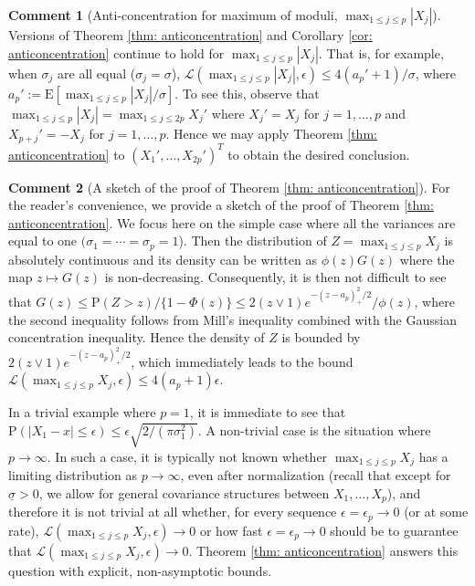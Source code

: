 \documentclass[11pt,reqno]{amsart}
\theoremstyle{definition}
\newtheorem{remark}{Comment}
\newcommand{\LL}{ \mathcal{L}}
\newcommand{\Ep}{{\mathrm{E}}}
\renewcommand{\Pr}{{\mathrm{P}}}
\begin{document}
\begin{remark}[Anti-concentration for maximum  of moduli, $\max_{1 \leq j \leq p} | X_{j} |$]
Versions of Theorem \ref{thm: anticoncentration} and Corollary \ref{cor: anticoncentration} continue to hold for $\max_{1 \leq j \leq p} | X_{j} |$.
That is, for example, when $\sigma_{j}$ are all equal ($\sigma_{j} = \sigma$), $\LL(\max_{1 \leq j \leq p} | X_{j} |, \epsilon ) \leq 4 ( a_{p}'+1)/\sigma$, where $a_{p}' := \Ep [ \max_{1 \leq j \leq p} | X_{j} |/\sigma ]$.  To see this, observe that $\max_{1 \leq j \leq p} | X_{j} | = \max_{1 \leq j \leq 2p} X_{j}'$ where $X_{j}'=X_{j}$ for $j=1,\dots,p$ and $X_{p+j}' = - X_{j}$ for $j=1,\dots,p$. Hence we may apply Theorem \ref{thm: anticoncentration} to $(X_{1}',\dots,X_{2p}')^{T}$ to obtain the desired conclusion.
\end{remark}

\begin{remark}[A sketch of the proof of Theorem \ref{thm: anticoncentration}]
For the reader's convenience, we provide a sketch of the proof of Theorem \ref{thm: anticoncentration}. We focus here on the simple case where all the variances are equal to one $(\sigma_{1}=\cdots=\sigma_{p}=1$). Then the distribution of $Z=\max_{1 \leq j \leq p} X_{j}$ is absolutely continuous and its density can be written as $\phi (z) G(z)$ where the map $z \mapsto G(z)$ is non-decreasing. Consequently, it is then not difficult to see that $G(z) \leq \Pr(Z > z)/\{ 1- \Phi(z) \} \leq 2 (z \vee 1) e^{-(z-a_{p})_{+}^{2}/2}/\phi(z)$, where the second inequality follows from Mill's inequality combined with  the Gaussian concentration inequality. Hence the density of $Z$ is bounded by $2 (z \vee 1) e^{-(z-a_{p})_{+}^{2}/2}$, which immediately leads to the bound $\LL (\max_{1 \leq j \leq p} X_{j},\epsilon) \leq 4 (a_{p}+1)\epsilon$.
\end{remark}

In a trivial example where $p=1$, it is immediate to see that $\Pr ( | X_{1} - x|  \leq   \epsilon  ) \leq \epsilon \sqrt{2/(\pi \sigma_{1}^{2})}$.
A non-trivial case is the situation where $p \to \infty$. In such a case, it is typically not known whether $\max_{1 \leq j \leq p} X_{j}$ has a limiting distribution as $p \to \infty$, even after normalization (recall that except for $\underline{\sigma} > 0$, we allow for general covariance structures between $X_{1},\dots,X_{p}$), and therefore it is not trivial at all whether,
for every sequence $\epsilon = \epsilon_{p} \to 0$ (or at some rate), $\LL (\max_{1 \leq j \leq p} X_{j},\epsilon) \to 0$ or how fast $\epsilon = \epsilon_{p} \to 0$ should be to guarantee that $\LL (\max_{1 \leq j \leq p} X_{j},\epsilon) \to 0$.
Theorem \ref{thm: anticoncentration} answers this question with explicit, non-asymptotic bounds.
\end{document}
